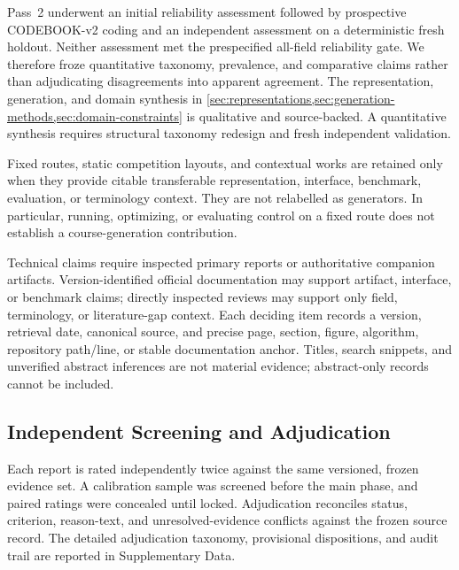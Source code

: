 Pass~2 underwent an initial reliability assessment followed by prospective
CODEBOOK-v2 coding and an independent assessment on a deterministic fresh holdout.
Neither assessment met the prespecified all-field reliability gate. We therefore
froze quantitative taxonomy, prevalence, and comparative claims rather than
adjudicating disagreements into apparent agreement. The representation,
generation, and domain synthesis in
\cref{sec:representations,sec:generation-methods,sec:domain-constraints} is
qualitative and source-backed. A quantitative synthesis
requires structural taxonomy redesign and fresh independent validation.

Fixed routes, static competition layouts, and contextual works are retained only
when they provide citable transferable representation, interface, benchmark,
evaluation, or terminology context. They are not relabelled as generators.
In particular, running, optimizing, or evaluating control on a fixed route does
not establish a course-generation contribution.

Technical claims require inspected primary reports or authoritative companion
artifacts. Version-identified official documentation may support artifact,
interface, or benchmark claims; directly inspected reviews may support only
field, terminology, or literature-gap context. Each deciding item records a
version, retrieval date, canonical source, and precise page, section, figure,
algorithm, repository path/line, or stable documentation anchor. Titles, search
snippets, and unverified abstract inferences are not material evidence;
abstract-only records cannot be included.

\subsection{Independent Screening and Adjudication}

Each report is rated independently twice against the same versioned,
frozen evidence set. A calibration sample was screened before the main phase,
and paired ratings were concealed until locked. Adjudication reconciles status,
criterion, reason-text, and unresolved-evidence conflicts against the frozen
source record. The detailed adjudication taxonomy, provisional dispositions,
and audit trail are reported in Supplementary Data.

